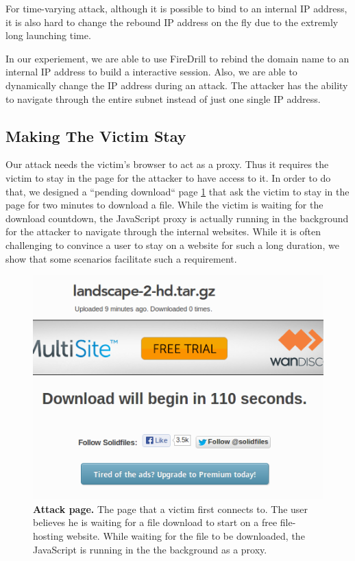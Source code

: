 For time-varying attack, although it is possible to bind to an internal IP address, it is also hard to change the rebound IP address on the fly due to the extremly long launching time. 

In our experiement, we are able to use FireDrill to rebind the domain name to an internal IP address to build a interactive session. Also, we are able to dynamically change the IP address during an attack. The attacker has the ability to navigate through the entire subnet instead of just one single IP address.

\subsection{Making The Victim Stay}
Our attack needs the victim's browser to act as a proxy. Thus it requires the victim to stay in the page for the attacker to have access to it. In order to do that, we designed a ``pending download`` page \ref{fig:download} that ask the victim to stay in the page for two minutes to download a file. While the victim is waiting for the download countdown, the JavaScript proxy is actually running in the background for the attacker to navigate through the internal websites. While it is often challenging to convince a user to stay on a website for such a long duration, we show that some scenarios facilitate such a requirement.

\begin{figure}[ht]
\centering
\includegraphics[width=0.8\columnwidth]{download.png}
\caption{\textbf{Attack page.} The page that a victim first connects to. The user believes he is waiting for a file download to start on a free file-hosting website. While waiting for the file to be downloaded, the JavaScript is running in the the background as a proxy.}
\label{fig:download}
\end{figure}

